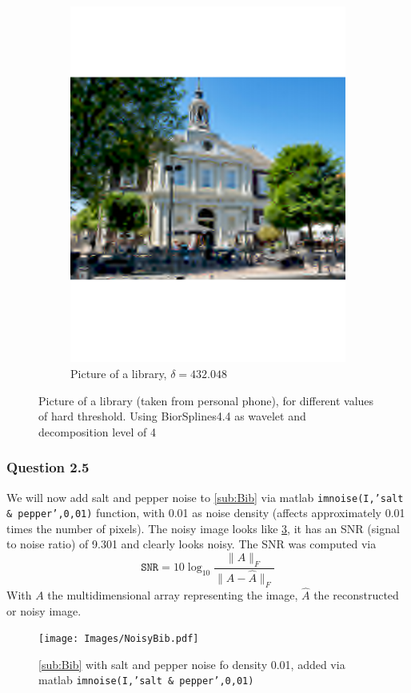 \documentclass[a4paper]{article}
\begin{document}
\begin{figure}[H]
\begin{subfigure}{0.49\textwidth}
	\includegraphics[trim={4cm 8cm 4cm 8cm},clip,width=1\textwidth]{Images/BibBad.pdf}
	\caption{Picture of a library, $\delta = 432.048$}
	\label{sub:BibBad}
\end{subfigure}
	\caption{Picture of a library (taken from personal phone), for different values of hard threshold. Using BiorSplines4.4 as wavelet and decomposition level of 4}
	\label{fig:Bib}
\end{figure}

    \subsubsection{Question 2.5} \label{subsubsec:stdWave}

	We will now add salt and pepper noise to \cref{sub:Bib} via matlab \texttt{imnoise(I,'salt \& pepper',0,01)} function, with 0.01 as noise density (affects approximately 0.01 times the number of pixels). The noisy image looks like \cref{fig:Noisy}, it has an SNR (signal to noise ratio) of 9.301 and clearly looks noisy. The SNR was computed via
	\begin{equation} \label{eq:SNR}
		\texttt{SNR} = 10 \log_{10}{\frac{\|A\|_F}{\|A-\hat{A}\|_F}}
	\end{equation}
	With $A$ the multidimensional array representing the image, $\hat{A}$ the reconstructed or noisy image.
    \begin{figure}[H]
	\centering
	\texttt{[image: Images/NoisyBib.pdf]}
	\caption{\cref{sub:Bib} with salt and pepper noise fo density 0.01, added via matlab \texttt{imnoise(I,'salt \& pepper',0,01)}}
	\label{fig:Noisy}
\end{figure}
\end{document}
